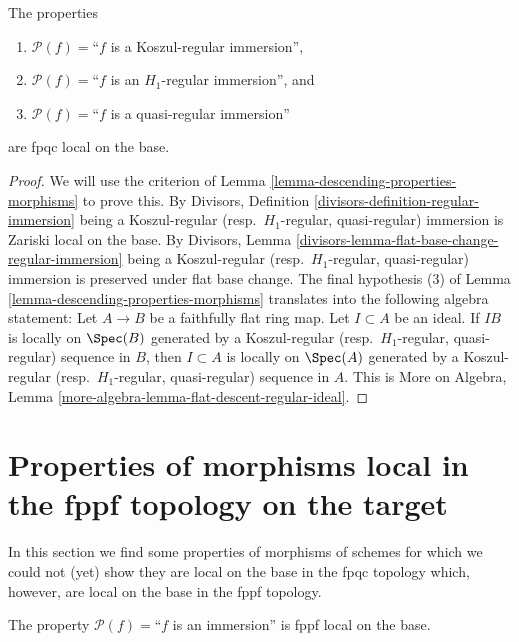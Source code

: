 \begin{lemma}
\label{lemma-descending-property-regular-immersion}
The properties
\begin{enumerate}
\item[] $\mathcal{P}(f) =$``$f$ is a Koszul-regular immersion'',
\item[] $\mathcal{P}(f) =$``$f$ is an $H_1$-regular immersion'', and
\item[] $\mathcal{P}(f) =$``$f$ is a quasi-regular immersion''
\end{enumerate}
are fpqc local on the base.
\end{lemma}

\begin{proof}
We will use the criterion of
Lemma \ref{lemma-descending-properties-morphisms}
to prove this. By
Divisors, Definition \ref{divisors-definition-regular-immersion}
being a Koszul-regular (resp.\ $H_1$-regular, quasi-regular)
immersion is Zariski local on the base. By
Divisors, Lemma \ref{divisors-lemma-flat-base-change-regular-immersion}
being a Koszul-regular (resp.\ $H_1$-regular, quasi-regular)
immersion is preserved under flat base change.
The final hypothesis (3) of
Lemma \ref{lemma-descending-properties-morphisms}
translates into the following algebra statement:
Let $A \to B$ be a faithfully flat ring map. Let $I \subset A$ be an ideal.
If $IB$ is locally on $\Spec(B)$ generated by a Koszul-regular
(resp.\ $H_1$-regular, quasi-regular) sequence in $B$, then $I \subset A$
is locally on $\Spec(A)$ generated by a Koszul-regular
(resp.\ $H_1$-regular, quasi-regular) sequence in $A$. This is
More on Algebra, Lemma \ref{more-algebra-lemma-flat-descent-regular-ideal}.
\end{proof}










\section{Properties of morphisms local in the fppf topology on the target}
\label{section-descending-properties-morphisms-fppf}

\noindent
In this section we find some properties of morphisms of schemes
for which we could not (yet) show they are local on the base in
the fpqc topology which, however, are local on the base
in the fppf topology.

\begin{lemma}
\label{lemma-descending-fppf-property-immersion}
The property $\mathcal{P}(f) =$``$f$ is an immersion''
is fppf local on the base.
\end{lemma}


